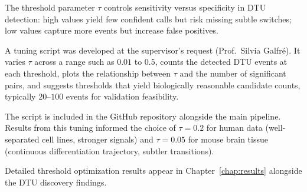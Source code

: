 The threshold parameter $\tau$ controls sensitivity versus specificity in DTU detection: high values yield few confident calls but risk missing subtle switches; low values capture more events but increase false positives.

A tuning script was developed at the supervisor's request (Prof.\ Silvia Galfr\'e). It varies $\tau$ across a range such as $0.01$ to $0.5$, counts the detected DTU events at each threshold, plots the relationship between $\tau$ and the number of significant pairs, and suggests thresholds that yield biologically reasonable candidate counts, typically $20$--$100$ events for validation feasibility.

The script is included in the GitHub repository alongside the main pipeline. Results from this tuning informed the choice of $\tau = 0.2$ for human data (well-separated cell lines, stronger signals) and $\tau = 0.05$ for mouse brain tissue (continuous differentiation trajectory, subtler transitions).

Detailed threshold optimization results appear in Chapter~\ref{chap:results} alongside the DTU discovery findings.
